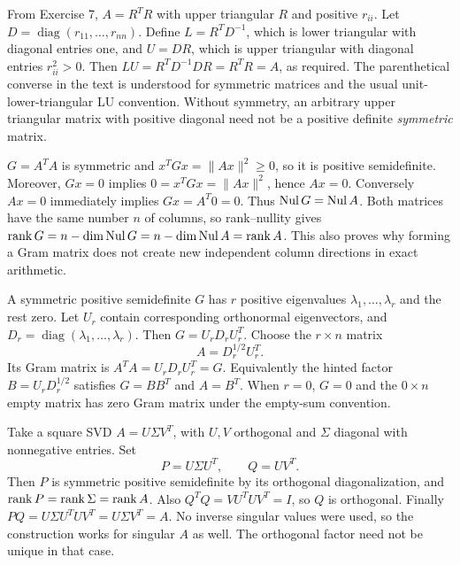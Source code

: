 From Exercise 7, $A=R^TR$ with upper triangular $R$ and positive
$r_{ii}$. Let $D=\operatorname{diag}(r_{11},\ldots,r_{nn})$.
Define $L=R^TD^{-1}$, which is lower triangular with diagonal entries one,
and $U=DR$, which is upper triangular with diagonal entries $r_{ii}^2>0$.
Then $LU=R^TD^{-1}DR=R^TR=A$, as required.
The parenthetical converse in the text is understood for symmetric matrices
and the usual unit-lower-triangular LU convention. Without symmetry, an
arbitrary upper triangular matrix with positive diagonal need not be a
positive definite \emph{symmetric} matrix.

$G=A^TA$ is symmetric and $x^TGx=\|Ax\|^2\ge0$, so it is positive
semidefinite. Moreover,
$Gx=0$ implies $0=x^TGx=\|Ax\|^2$, hence $Ax=0$.
Conversely $Ax=0$ immediately implies $Gx=A^T0=0$.
Thus $\operatorname{Nul} G=\operatorname{Nul} A$.
Both matrices have the same number $n$ of columns, so rank--nullity gives
$\operatorname{rank} G=n-\dim\operatorname{Nul} G=n-\dim\operatorname{Nul} A=\operatorname{rank} A$.
This also proves why forming a Gram matrix does not create new independent
column directions in exact arithmetic.

A symmetric positive semidefinite $G$ has $r$ positive eigenvalues
$\lambda_1,\ldots,\lambda_r$ and the rest zero.
Let $U_r$ contain corresponding orthonormal eigenvectors, and
$D_r=\operatorname{diag}(\lambda_1,\ldots,\lambda_r)$.
Then $G=U_rD_rU_r^T$. Choose the $r\times n$ matrix
\[
 \boxed{A=D_r^{1/2}U_r^T}.
\]
Its Gram matrix is $A^TA=U_rD_rU_r^T=G$.
Equivalently the hinted factor $B=U_rD_r^{1/2}$ satisfies $G=BB^T$
and $A=B^T$. When $r=0$, $G=0$ and the $0\times n$ empty matrix
has zero Gram matrix under the empty-sum convention.

Take a square SVD $A=U\Sigma V^T$, with $U,V$ orthogonal and
$\Sigma$ diagonal with nonnegative entries. Set
\[
 P=U\Sigma U^T,\qquad Q=UV^T.
\]
Then $P$ is symmetric positive semidefinite by its orthogonal diagonalization,
and $\operatorname{rank} P=\operatorname{rank}\Sigma=\operatorname{rank} A$.
Also $Q^TQ=VU^TUV^T=I$, so $Q$ is orthogonal. Finally
$PQ=U\Sigma U^TUV^T=U\Sigma V^T=A$.
No inverse singular values were used, so the construction works for singular
$A$ as well. The orthogonal factor need not be unique in that case.

